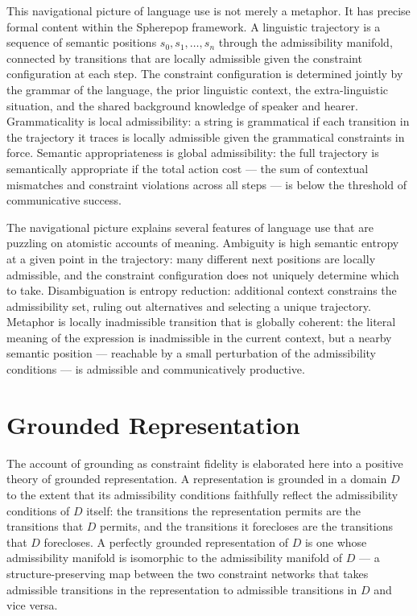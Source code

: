 \documentclass[12pt,openany]{book}
\theoremstyle{plain}
\theoremstyle{definition}
\theoremstyle{remark}
\begin{document}
This navigational picture of language use is not merely a metaphor. It has precise formal content within the Spherepop framework. A linguistic trajectory is a sequence of semantic positions $s_0, s_1, \ldots, s_n$ through the admissibility manifold, connected by transitions that are locally admissible given the constraint configuration at each step. The constraint configuration is determined jointly by the grammar of the language, the prior linguistic context, the extra-linguistic situation, and the shared background knowledge of speaker and hearer. Grammaticality is local admissibility: a string is grammatical if each transition in the trajectory it traces is locally admissible given the grammatical constraints in force. Semantic appropriateness is global admissibility: the full trajectory is semantically appropriate if the total action cost — the sum of contextual mismatches and constraint violations across all steps — is below the threshold of communicative success.

The navigational picture explains several features of language use that are puzzling on atomistic accounts of meaning. Ambiguity is high semantic entropy at a given point in the trajectory: many different next positions are locally admissible, and the constraint configuration does not uniquely determine which to take. Disambiguation is entropy reduction: additional context constrains the admissibility set, ruling out alternatives and selecting a unique trajectory. Metaphor is locally inadmissible transition that is globally coherent: the literal meaning of the expression is inadmissible in the current context, but a nearby semantic position — reachable by a small perturbation of the admissibility conditions — is admissible and communicatively productive.

\section{Grounded Representation}

The account of grounding as constraint fidelity is elaborated here into a positive theory of grounded representation. A representation is grounded in a domain $D$ to the extent that its admissibility conditions faithfully reflect the admissibility conditions of $D$ itself: the transitions the representation permits are the transitions that $D$ permits, and the transitions it forecloses are the transitions that $D$ forecloses. A perfectly grounded representation of $D$ is one whose admissibility manifold is isomorphic to the admissibility manifold of $D$ — a structure-preserving map between the two constraint networks that takes admissible transitions in the representation to admissible transitions in $D$ and vice versa.
\end{document}
